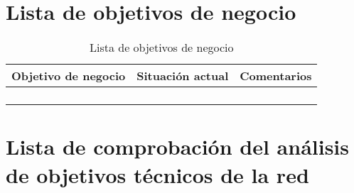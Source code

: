 \section{Lista de objetivos de negocio}

\begin{table}[H]
	\begin{center}
		\begin{tabular}{|l|l|l|}
			\hline 
			Objetivo de negocio & Situación actual & Comentarios \\ 
			\hline \hline
			& & \\ \hline
			& & \\ \hline
			& & \\ \hline
			& & \\ \hline		
		\end{tabular}
		\caption{Lista de objetivos de negocio}
		\label{tabla:tabla3}
	\end{center}
\end{table}

\section{Lista de comprobación del análisis de objetivos técnicos de la red}


